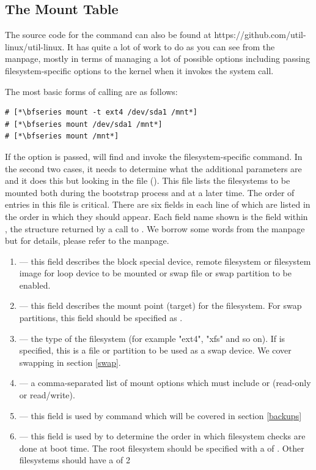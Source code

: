 \subsection{The Mount Table}

The source code for the  command can also be found at https://github.com/util-linux/util-linux. It has quite a lot of work to do as you can see from the manpage, mostly in terms of managing a lot of possible options including passing filesystem-specific options to the kernel when it invokes the  system call.

The most basic forms of calling  are as follows:

\begin{lstlisting}
# [*\bfseries mount -t ext4 /dev/sda1 /mnt*]
# [*\bfseries mount /dev/sda1 /mnt*]
# [*\bfseries mount /mnt*]
\end{lstlisting}

\noindent
If the  option is passed,  will find and invoke the filesystem-specific  command. In the second two cases, it needs to determine what the additional parameters are and it does this but looking in the  file (). This file lists the filesystems to be mounted both during the bootstrap process and at a later time. The order of entries in this file is critical. There are six fields in each line of  which are listed in the order in which they should appear. Each field name shown is the field within , the structure returned by a call to . We borrow some words from the manpage but for details, please refer to the manpage.

\begin{enumerate}
	\item {} --- this field describes the block special device, remote filesystem or 
		filesystem image for loop device to be mounted or swap file or swap
		partition to be enabled.
	\item {} --- this field describes the mount point (target) for the filesystem. For
		swap partitions, this field should be specified as .
	\item {} --- the type of the filesystem (for example "ext4", "xfs" and so on). If 
		is specified, this is a file or partition to be used as a swap device. We cover swapping in 
		section \ref{swap}.
	\item {} --- a comma-separated list of mount options which must include  or 
		(read-only or read/write).
	\item {} --- this field is used by  command which will be covered in section \ref{backups}
	\item {} --- this field is used by  to determine the order in which filesystem 
		checks are done at boot time. The root filesystem should be specified with a  of . 
		Other filesystems should have a  of 2
\end{enumerate}

